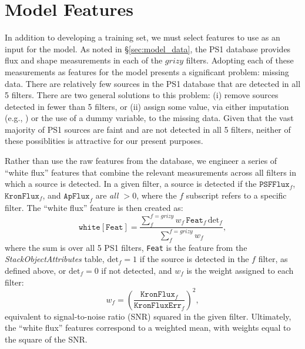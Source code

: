 \documentclass[twocolumn]{aastex62}
\begin{document}
\section{Model Features}\label{sec:model_features}

In addition to developing a training set, we must select features to use as an input for the model. As noted in \S\ref{sec:model_data}, the PS1 database provides flux and shape measurements in each of the $grizy$ filters. Adopting each of these measurements as features for the model presents a significant problem: missing data. There are relatively few sources in the PS1 database that are detected in all 5 filters. There are two general solutions to this problem: (i) remove sources detected in fewer than 5 filters, or (ii) assign some value, via either imputation (e.g., \citealt{Miller17}) or the use of a dummy variable, to the missing data. Given that the vast majority of PS1 sources are faint and are not detected in all 5 filters, neither of these possiblities is attractive for our present purposes.

Rather than use the raw features from the database, we engineer a series of ``white flux'' features that combine the relevant measurements across all filters in which a source is detected. In a given filter, a source is detected if the $\mathtt{PSFFlux}_f$, $\mathtt{KronFlux}_f$, and $\mathtt{ApFlux}_f$ are \textit{all $> 0$}, where the $f$ subscript refers to a specific filter. The ``white flux'' feature is then created as:
%
\begin{equation}
    \mathtt{white[Feat]} =  \frac{\sum_f^{f = grizy} w_f  \, \mathtt{Feat}_f \, \mathrm{det}_f}{\sum_f^{f = grizy} w_f}, 
\end{equation}
%
where the sum is over all 5 PS1 filters, \texttt{Feat} is the feature from the \textit{StackObjectAttributes} table, $\mathrm{det}_f = 1$ if the source is detected in the $f$ filter, as defined above, or $\mathrm{det}_f = 0$ if not detected, and $w_f$ is the weight assigned to each filter:
%
\begin{equation}
    w_f = \left(\frac{\mathtt{KronFlux}_f}{\mathtt{KronFluxErr}_f}\right)^2,
\end{equation}
%
equivalent to signal-to-noise ratio (SNR) squared in the given filter. Ultimately, the ``white flux'' features correspond to a weighted mean, with weights equal to the square of the SNR. 
\end{document}

